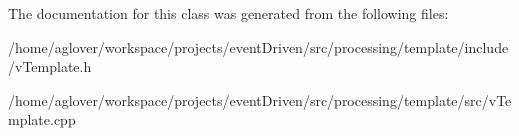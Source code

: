 The documentation for this class was generated from the following files\-:\begin{DoxyCompactItemize}
\item 
/home/aglover/workspace/projects/event\-Driven/src/processing/template/include/v\-Template.\-h\item 
/home/aglover/workspace/projects/event\-Driven/src/processing/template/src/v\-Template.\-cpp\end{DoxyCompactItemize}
